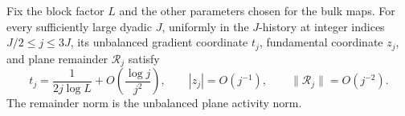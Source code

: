 \begin{proposition}
\label{prop:bulk-window}
Fix the block factor $L$ and the other parameters chosen for the
bulk maps.  For every sufficiently large dyadic $J$, uniformly in
the $J$-history at integer indices $J/2\le j\le3J$, its unbalanced
gradient coordinate $t_j$, fundamental coordinate $z_j$, and plane
remainder $\mathcal R_j$ satisfy
\begin{equation}
 t_j=\frac1{2j\log L}
                 +O\left(\frac{\log j}{j^2}\right),
 \qquad |z_j|=O(j^{-1}),
 \qquad \|\mathcal R_j\|=O(j^{-2}).
 \label{eq:trajectory-bulk-window}
\end{equation}
The remainder norm is the unbalanced plane activity norm.
\end{proposition}

